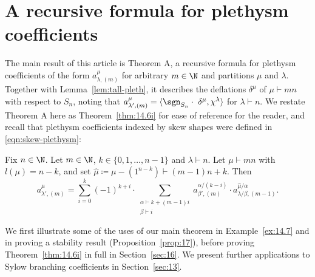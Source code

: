\section{A recursive formula for plethysm coefficients}\label{sec:14}
The main result of this article is Theorem A, a recursive formula for plethysm coefficients of the form $a^\mu_{\lambda,(m)}$ for arbitrary $m\in\N$ and partitions $\mu$ and $\lambda$. Together with Lemma~\ref{lem:tall-pleth}, it describes the deflations $\delta^\mu$ of $\mu\vdash mn$ with respect to $S_n$, noting that $a^\mu_{\lambda',(m)}=\langle \sgn_{S_n}\cdot\ \delta^\mu,\chi^\lambda\rangle$ for $\lambda\vdash n$. We restate Theorem A here as Theorem~\ref{thm:14.6i} for ease of reference for the reader, and recall that plethysm coefficients indexed by skew shapes were defined in \eqref{eqn:skew-plethysm}:

\begin{theorem}[Theorem A]\label{thm:14.6i}
	Fix $n\in\N$. Let $m\in\N$, $k\in\{0,1,\dotsc,n-1\}$ and $\lambda\vdash n$. Let $\mu\vdash mn$ with $l(\mu)=n-k$, and set $\hat{\mu}\coloneqq \mu-(1^{n-k})\vdash (m-1)n+k$. Then
	\begin{equation}\label{eqn:A}
		a^\mu_{\lambda',(m)} = \sum_{i=0}^k (-1)^{k+i} \cdot \sum_{\substack{\alpha\vdash k+(m-1)i\\\beta\vdash i}} a^{\alpha/(k-i)}_{\beta',(m)}\cdot a^{\hat{\mu}/\alpha}_{\lambda/\beta,(m-1)}.
	\end{equation}
\end{theorem}

We first illustrate some of the uses of our main theorem in Example~\ref{ex:14.7} and in proving a stability result (Proposition~\ref{prop:17}), before proving Theorem~\ref{thm:14.6i} in full in Section~\ref{sec:16}. We present further applications to Sylow branching coefficients in Section~\ref{sec:13}.

